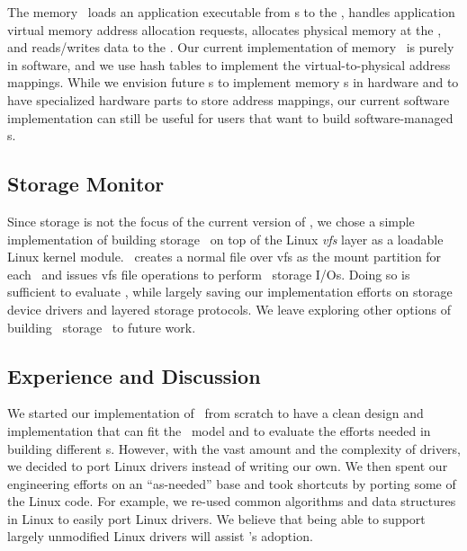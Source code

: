 \documentclass[10pt,times,twocolumn]{z2-article}
\begin{document}
{{{{{{{The memory \microos\ loads an application executable from \scomponent{}s 
to the \mcomponent, handles application virtual memory address allocation requests,
allocates physical memory at the \mcomponent,
and reads/writes data to the \mcomponent.
Our current implementation of memory \microos\ is purely in software,
and we use hash tables to implement the virtual-to-physical address mappings.
While we envision future \mcomponent{}s to implement memory \microos{}s in hardware and
to have specialized hardware parts to store address mappings,
our current software implementation can still be useful for 
users that want to build software-managed \mcomponent{}s.

\subsection{Storage Monitor}
Since storage is not the focus of the current version of \lego,
we chose a simple implementation of building storage \microos\ on top of the Linux {\em vfs} layer as a loadable Linux kernel module.
\lego\ creates a normal file over vfs as the mount partition for each \vnode\
and issues vfs file operations to perform \lego\ storage I/Os.
Doing so is sufficient to evaluate \lego, while largely saving our implementation efforts on storage device drivers and layered storage protocols.
We leave exploring other options of building \lego\ storage \microos\ to future work.


\subsection{Experience and Discussion}
We started our implementation of \lego\ from scratch to have a clean design and implementation that 
can fit the \splitkernel\ model
and to evaluate the efforts needed in building different \microos{}s.
However, with the vast amount and the complexity of drivers, we decided to port Linux drivers
instead of writing our own.
We then spent our engineering efforts on an ``as-needed'' base
and took shortcuts by porting some of the Linux code. 
For example, we re-used common algorithms and data structures in Linux to easily port Linux drivers.
We believe that being able to support largely unmodified Linux drivers
will assist \lego's adoption.

}}}}}}}
\end{document}
